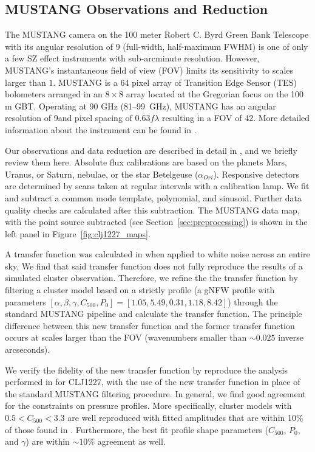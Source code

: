 \documentclass[twocolumn,traditabstract]{aa}
\begin{document}
\subsection{MUSTANG Observations and Reduction}
\label{sec:musobs}
The MUSTANG camera \citep{dicker2008}
on the 100 meter Robert C. Byrd Green Bank Telescope \citep[GBT, ][]{jewell2004} with its angular resolution of 9\asec 
(full-width, half-maximum FWHM) is one of only a few SZ effect instruments with sub-arcminute resolution.
However, MUSTANG's instantaneous field of view (FOV) limits its sensitivity to scales larger than $1$\amin.
MUSTANG is a 64 pixel array of Transition Edge Sensor (TES) bolometers arranged in an $8 \times 8$ array
located at the Gregorian focus on the 100 m GBT. Operating at 90 GHz (81--99~GHz),
MUSTANG has an angular resolution of 9\asec and pixel spacing of 0.63$f \lambda$ resulting in a FOV
of 42\asec. More detailed information about the instrument can be found in \citet{dicker2008}.

Our observations and data reduction are described in detail in \citet{romero2015a}, and we briefly review them
here. Absolute flux calibrations are based on the planets Mars, Uranus, or Saturn, nebulae, or the star Betelgeuse 
($\alpha_{Ori}$). Responsive detectors are determined by scans taken at regular intervals with a calibration lamp.
We fit and subtract a common mode template, polynomial, and sinusoid. Further data quality checks are calculated
after this subtraction. The MUSTANG data map, with the point source subtracted (see Section~\ref{sec:preprocessing})
is shown in the left panel in Figure~\ref{fig:clj1227_maps}.


A transfer function was calculated in \citet{romero2016} when applied to white noise
across an entire sky. We find that said transfer function does not fully reproduce the results of a simulated
cluster observation. Therefore, we refine the the transfer function by filtering a cluster model based on a strictly
 profile (a gNFW profile with parameters
$[\alpha,\beta,\gamma,C_{500},P_0]=[1.05,5.49,0.31,1.18,8.42]$) through the standard MUSTANG pipeline and calculate
the transfer function. The principle difference between this new transfer function and the former transfer function
occurs at scales larger than the FOV (wavenumbers smaller than $\sim0.025$ inverse arcseconds).

We verify the fidelity of the new transfer function by reproduce the analysis performed in \citet{romero2016} for CLJ1227,
with the use of the new transfer function in place of the standard MUSTANG filtering procedure.
In general, we find good agreement for the constraints on pressure profiles. More specifically, cluster models with
$0.5 < C_{500} < 3.3$ are well reproduced with fitted amplitudes that are within 10\% of those found in \citet{romero2016}.
Furthermore, the best fit profile shape parameters ($C_{500}$, $P_0$, and $\gamma$) are within $\sim10$\% agreement as well.
\end{document}

